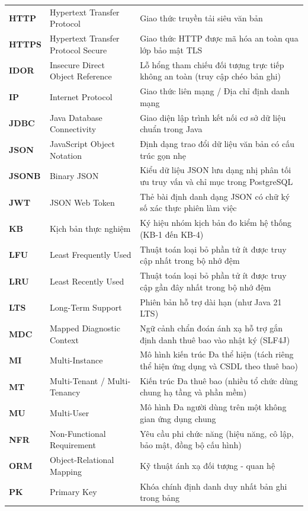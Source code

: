 \begin{longtable}{P{.14\textwidth}P{.30\textwidth}P{.47\textwidth}}
\textbf{HTTP} & Hypertext Transfer Protocol & Giao thức truyền tải siêu văn bản \\
\textbf{HTTPS} & Hypertext Transfer Protocol Secure & Giao thức HTTP được mã hóa an toàn qua lớp bảo mật TLS \\
\textbf{IDOR} & Insecure Direct Object Reference & Lỗ hổng tham chiếu đối tượng trực tiếp không an toàn (truy cập chéo bản ghi) \\
\textbf{IP} & Internet Protocol & Giao thức liên mạng / Địa chỉ định danh mạng \\
\textbf{JDBC} & Java Database Connectivity & Giao diện lập trình kết nối cơ sở dữ liệu chuẩn trong Java \\
\textbf{JSON} & JavaScript Object Notation & Định dạng trao đổi dữ liệu văn bản có cấu trúc gọn nhẹ \\
\textbf{JSONB} & Binary JSON & Kiểu dữ liệu JSON lưu dạng nhị phân tối ưu truy vấn và chỉ mục trong PostgreSQL \\
\textbf{JWT} & JSON Web Token & Thẻ bài định danh dạng JSON có chữ ký số xác thực phiên làm việc \\
\textbf{KB} & Kịch bản thực nghiệm & Ký hiệu nhóm kịch bản đo kiểm hệ thống (KB-1 đến KB-4) \\
\textbf{LFU} & Least Frequently Used & Thuật toán loại bỏ phần tử ít được truy cập nhất trong bộ nhớ đệm \\
\textbf{LRU} & Least Recently Used & Thuật toán loại bỏ phần tử ít được truy cập gần đây nhất trong bộ nhớ đệm \\
\textbf{LTS} & Long-Term Support & Phiên bản hỗ trợ dài hạn (như Java 21 LTS) \\
\textbf{MDC} & Mapped Diagnostic Context & Ngữ cảnh chẩn đoán ánh xạ hỗ trợ gắn định danh thuê bao vào nhật ký (SLF4J) \\
\textbf{MI} & Multi-Instance & Mô hình kiến trúc Đa thể hiện (tách riêng thể hiện ứng dụng và CSDL theo thuê bao) \\
\textbf{MT} & Multi-Tenant / Multi-Tenancy & Kiến trúc Đa thuê bao (nhiều tổ chức dùng chung hạ tầng và phần mềm) \\
\textbf{MU} & Multi-User & Mô hình Đa người dùng trên một không gian ứng dụng chung \\
\textbf{NFR} & Non-Functional Requirement & Yêu cầu phi chức năng (hiệu năng, cô lập, bảo mật, đồng bộ cấu hình) \\
\textbf{ORM} & Object-Relational Mapping & Kỹ thuật ánh xạ đối tượng - quan hệ \\
\textbf{PK} & Primary Key & Khóa chính định danh duy nhất bản ghi trong bảng \\

\end{longtable}
